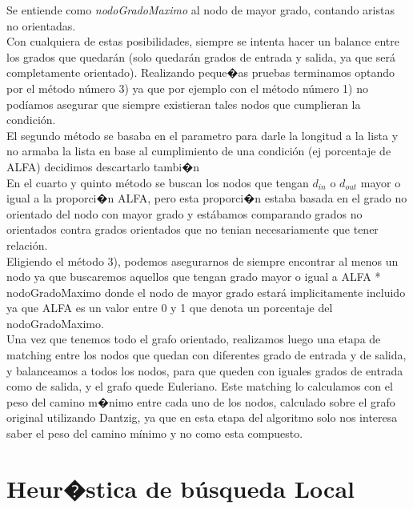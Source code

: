 \documentclass[11pt, a4paper, spanish]{article}
\begin{document}
Se entiende como \emph{nodoGradoMaximo} al nodo de mayor grado, contando aristas no orientadas.\\

Con cualquiera de estas posibilidades, siempre se intenta hacer un balance entre los grados que quedar\'an (solo quedar\'an grados de entrada y salida, ya que ser\'a completamente orientado). Realizando peque�as pruebas terminamos optando por el m\'etodo n\'umero 3) ya que por ejemplo con el m\'etodo n\'umero 1) no pod\'iamos asegurar que siempre existieran tales nodos que cumplieran la condici\'on.\\

El segundo m\'etodo se basaba en el parametro para darle la longitud a la lista y no armaba la lista en base al cumplimiento de una condici\'on (ej porcentaje de ALFA) decidimos descartarlo tambi�n\\

En el cuarto y quinto m\'etodo se buscan los nodos que tengan $d_{in}$ o $d_{out}$ mayor o igual a la proporci�n ALFA, pero esta proporci�n estaba basada en el grado no orientado del nodo con mayor grado y est\'abamos comparando grados no orientados contra grados orientados que no tenian necesariamente que tener relaci\'on.\\

Eligiendo el m\'etodo 3), podemos asegurarnos de siempre encontrar al menos un nodo ya que buscaremos aquellos que tengan grado mayor o igual a ALFA * nodoGradoMaximo donde el nodo de mayor grado estar\'a implicitamente incluido ya que ALFA es un valor entre 0 y 1 que denota un porcentaje del nodoGradoMaximo.\\

Una vez que tenemos todo el grafo orientado, realizamos luego una etapa de matching entre los nodos que quedan con diferentes grado de entrada y de salida, y balanceamos a todos los nodos, para que queden con iguales grados de entrada como de salida, y el grafo quede Euleriano. Este matching lo calculamos con el peso del camino m�nimo entre cada uno de los nodos, calculado sobre el grafo original utilizando Dantzig, ya que en esta etapa del algoritmo solo nos interesa saber el peso del camino m\'inimo y no como esta compuesto.\\


\newpage	
\section{Heur�stica de b\'usqueda Local}
\end{document}
